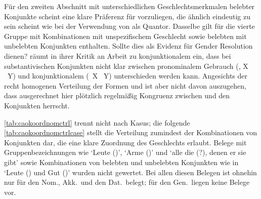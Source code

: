Für den zweiten Abschnitt mit unterschiedlichen Geschlechtsmerkmalen belebter
Konjunkte scheint eine klare Präferenz für  vorzuliegen, die
ähnlich eindeutig zu sein scheint wie bei der Verwendung von  als
Quantor. Dasselbe gilt für die vierte Gruppe mit Kombinationen mit
unspezifischem Geschlecht sowie belebten mit unbelebten Konjunkten enthalten.
Sollte dies als Evidenz für Gender Resolution dienen? \citet[187]{gjelsten1980}
räumt in ihrer Kritik an  Arbeit zu konjunktionalem
 ein, dass bei substantivischen Konjunkten nicht klar zwischen
pronominalem Gebrauch (, X ~Y) und konjunktionalem
(~X ~Y) unterschieden werden kann. Angesichts der recht
homogenen Verteilung der Formen  und  ist aber nicht
davon auszugehen, dass ausgerechnet hier plötzlich regelmäßig Kongruenz
zwischen  und den Konjunkten herrscht.

\cref{tab:caokoordnomctrl} trennt nicht nach Kasus; die folgende
\cref{tab:caokoordnomctrlcase} stellt die Verteilung zumindest der
Kombinationen von Konjunkten dar, die eine klare Zuordnung des Geschlechts
erlaubt. Belege mit Gruppenbezeichnungen wie  `Leute
(\MascA)',  `Arme (\MascA)' und  `alle die (\MascA?), denen er sie gibt' sowie Kombinationen von
belebten und unbelebten Konjunkten wie in  `Leute
(\MascA) und Gut (\NeutI)' wurden nicht gewertet. Bei allen diesen Belegen ist
ohnehin nur  für den Nom., Akk.\ und den Dat.\ belegt; für den
Gen.\ liegen keine Belege vor.

